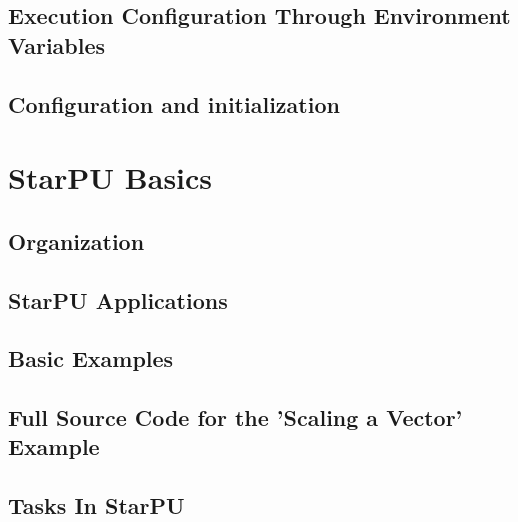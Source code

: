 \chapter{Execution Configuration Through Environment Variables}
\label{ExecutionConfigurationThroughEnvironmentVariables}
\hypertarget{ExecutionConfigurationThroughEnvironmentVariables}{}


\chapter{Configuration and initialization}
\label{ConfigurationAndInitialization}
\hypertarget{ConfigurationAndInitialization}{}


\part{StarPU Basics}

\chapter{Organization}
\label{IntroBasics}
\hypertarget{IntroBasics}{}


\chapter{StarPU Applications}
\label{StarPUApplications}
\hypertarget{StarPUApplications}{}


\chapter{Basic Examples}
\label{BasicExamples}
\hypertarget{BasicExamples}{}


\chapter{Full Source Code for the ’Scaling a Vector’ Example}
\label{FullSourceCodeVectorScal}
\hypertarget{FullSourceCodeVectorScal}{}


\chapter{Tasks In StarPU}
\label{TasksInStarPU}
\hypertarget{TasksInStarPU}{}


